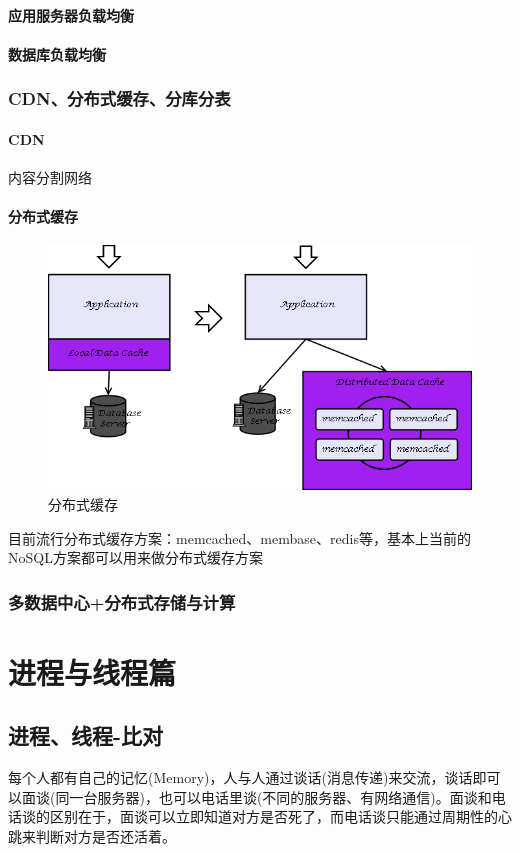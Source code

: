 \documentclass[UTF8,a4paper,8pt]{ctexbook}
\begin{document}
			\subsubsection{应用服务器负载均衡}
			
			\subsubsection{数据库负载均衡}
			
		\subsection{CDN、分布式缓存、分库分表}
			\subsubsection{CDN}内容分割网络
			
			\subsubsection{分布式缓存}		
				\begin{figure}[ht]
					\centering
					\includegraphics[width=0.7\linewidth]{server-distributedCache}
					\caption{分布式缓存}
					\label{fig:server-distributedcache}
				\end{figure}
				
			 目前流行分布式缓存方案：memcached、membase、redis等，基本上当前的NoSQL方案都可以用来做分布式缓存方案
			 
		\subsection{多数据中心+分布式存储与计算}
		
		
\chapter{进程与线程篇}
	\section{进程、线程-比对}
 	 每个人都有自己的记忆(Memory)，人与人通过谈话(消息传递)来交流，谈话即可以面谈(同一台服务器)，也可以电话里谈(不同的服务器、有网络通信)。面谈和电话谈的区别在于，面谈可以立即知道对方是否死了，而电话谈只能通过周期性的心跳来判断对方是否还活着。
 	 
\end{document}
